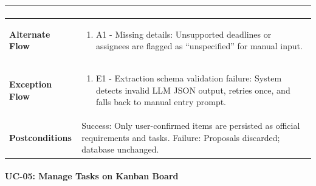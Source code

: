 \begin{longtable}{>{\raggedright\arraybackslash}p{}>{\raggedright\arraybackslash}p{}}
\begin{enumerate}[nosep,leftmargin=*,label=\arabic*.]
\end{enumerate} \\ \hline

\textbf{Alternate Flow} & \begin{enumerate}[nosep,leftmargin=*,label=\arabic*.]

    \item A1 - Missing details: Unsupported deadlines or assignees are flagged as ``unspecified'' for manual input.

\end{enumerate} \\ \hline

\textbf{Exception Flow} & \begin{enumerate}[nosep,leftmargin=*,label=\arabic*.]

    \item E1 - Extraction schema validation failure: System detects invalid LLM JSON output, retries once, and falls back to manual entry prompt.

\end{enumerate} \\ \hline

\textbf{Postconditions} & Success: Only user-confirmed items are persisted as official requirements and tasks. Failure: Proposals discarded; database unchanged. \\ \hline

\end{longtable}

\endgroup





\paragraph*{UC-05: Manage Tasks on Kanban Board}

\begingroup

\small

\setlength{\tabcolsep}{5pt}

\renewcommand{\arraystretch}{1.1}

